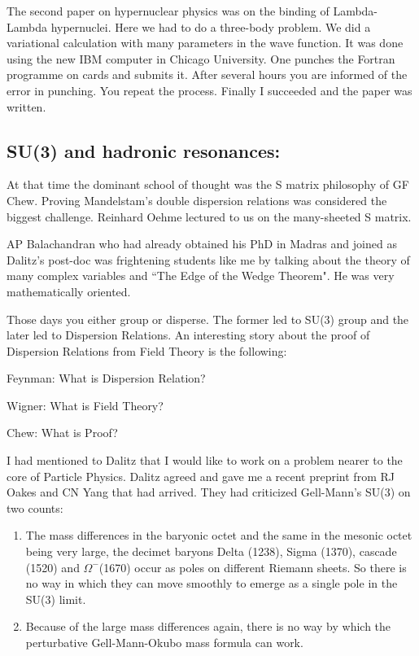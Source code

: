 The second paper on hypernuclear physics was on the bin\-ding of 
Lambda-Lambda hypernuclei. Here we had to do a three-body problem. We 
did a variational calculation with many para\-meters in the wave function. 
It was done using the new IBM computer in Chicago University. One 
punches the Fortran programme on cards and submits it. After several 
hours you are informed of the error in punching. You repeat the process. 
Finally I succeeded and the paper was written.

\vspace{-\topsep}
\subsection*{SU(3) and hadronic resonances:}

At that time the dominant school of thought was the S matrix philosophy 
of GF Chew. Proving Mandelstam's double dispersion relations was 
considered the biggest challenge. Reinhard Oehme lectured to us on the 
many-sheeted S matrix.

AP Balachandran who had already obtained his PhD in Mad\-ras and joined as 
Dalitz's post-doc was frightening students like me by talking about the 
theory of many complex variables and ``The Edge of the Wedge Theorem". He 
was very mathematically oriented.

Those days you either group or disperse. The former led to SU(3) group 
and the later led to Dispersion Relations. An intere\-sting story about 
the proof of Dispersion Relations from Field Theory is the following:

Feynman: What is Dispersion Relation?

Wigner: What is Field Theory?

Chew: What is Proof?

I had mentioned to Dalitz that I would like to work on a pro\-blem nearer 
to the core of Particle Physics. Dalitz agreed and gave me a recent 
preprint from RJ Oakes and CN Yang that had arrived. They had criticized 
Gell-Mann's SU(3) on two counts:

\begin{enumerate}
\itemsep=0pt
\item The mass differences in the baryonic octet and the same in the mesonic 
octet being very large, the decimet baryons Delta (1238), Sigma (1370), 
cascade (1520) and $\Omega^-$(1670) occur as poles on different Riemann 
sheets. So there is no way in which they can move smoothly to emerge as 
a single pole in the SU(3) limit.
\item Because of the large mass differences again, there is no way by which 
the perturbative Gell-Mann-Okubo mass formula can work.
\end{enumerate}

